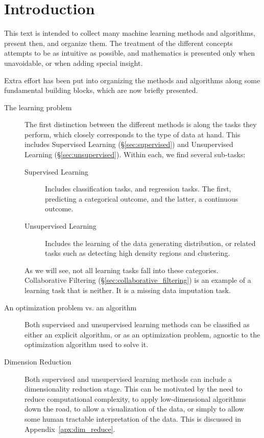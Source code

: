 \chapter{Introduction}
\label{sec:introduction}

This text is intended to collect many machine learning methods and algorithms, present then, and organize them.
The treatment of the different concepts attempts to be as intuitive as possible, and mathematics is presented only when unavoidable, or when adding special insight.

Extra effort has been put into organizing the methods and algorithms along some fundamental building blocks, which are now briefly presented.

\begin{description}

\item[The learning problem]
The first distinction between the different methods is along the tasks they perform, which closely corresponds to the type of data at hand. 
This includes Supervised Learning (\S\ref{sec:supervised}) and Unsupervised Learning (\S\ref{sec:unsupervised}).
Within each, we find several sub-tasks: 
	\begin{description}
	
	\item[Supervised Learning] Includes classification tasks, and regression tasks. The first, predicting a categorical outcome, and the latter, a continuous outcome.
	
	\item[Unsupervised Learning] Includes the learning of the data generating distribution, or related tasks such as detecting high density regions and clustering.
	\end{description}

As we will see, not all learning tasks fall into these categories. Collaborative Filtering (\S\ref{sec:collaborative_filtering}) is an example of a learning task that is neither. It is a missing data imputation task.

\item[An optimization problem vs. an algorithm]
Both supervised and unsupervised learning methods can be classified as either an explicit algorithm, or as an optimization problem, agnostic to the optimization algorithm used to solve it.

\item[Dimension Reduction]
Both supervised and unsupervised learning methods can include a dimensionality reduction stage. 
This can be motivated by the need to reduce computational complexity, to apply low-dimensional algorithms down the road, to allow a visualization of the data, or simply to allow some human tractable interpretation of the data.
This is discussed in Appendix~\ref{apx:dim_reduce}.


\end{description}
